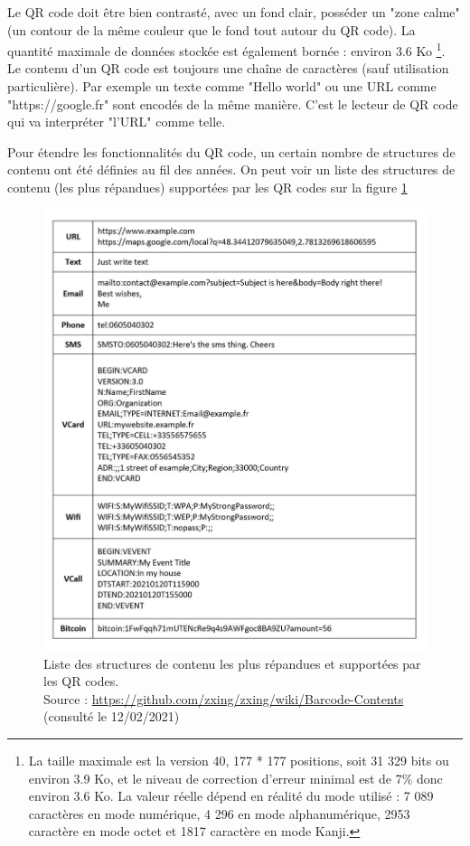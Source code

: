 \documentclass[a4paper,12pt]{article}
\begin{document}
\begin{itemize}
Le QR code doit être bien contrasté, avec un fond clair, posséder un "zone calme" (un contour de la même couleur que le fond tout autour du QR code). La quantité maximale de données stockée est également bornée : environ 3.6 Ko \footnote{La taille maximale est la version 40, 177 * 177 positions, soit 31 329 bits ou environ 3.9 Ko, et le niveau de correction d'erreur minimal est de 7\% donc environ 3.6 Ko. La valeur réelle dépend en réalité du mode utilisé : 7 089 caractères en mode numérique, 4 296 en mode alphanumérique, 2953 caractère en mode octet et 1817 caractère en mode Kanji.}.\\

Le contenu d'un QR code est toujours une chaîne de caractères (sauf utilisation particulière). Par exemple un texte comme "Hello world" ou une URL comme "https://google.fr" sont encodés de la même manière. C'est le lecteur de QR code qui va interpréter "l'URL" comme telle. 

Pour étendre les fonctionnalités du QR code, un certain nombre de structures de contenu ont été définies au fil des années. On peut voir un liste des structures de contenu (les plus répandues) supportées par les QR codes sur la figure \ref{fig:listStructureContent}


\begin{figure}[H]
    \begin{center}
        \includegraphics[width=.6\textwidth]{possible to do with QrCode.JPG}
        \caption{Liste des structures de contenu les plus répandues et supportées par les QR codes.\\Source : \url{https://github.com/zxing/zxing/wiki/Barcode-Contents} (consulté le 12/02/2021)}
        \label{fig:listStructureContent}
    \end{center}
\end{figure}


\end{itemize}
\end{document}
